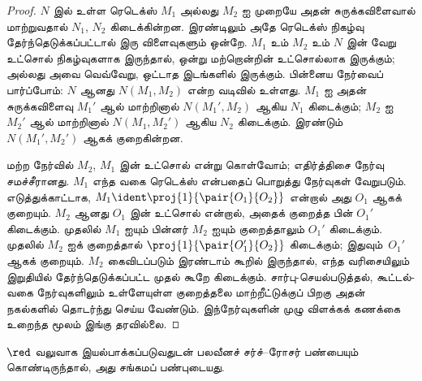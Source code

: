 \documentclass[../../../include/open-logic-section]{subfiles}
\begin{document}
\begin{proof}
  $N$ இல் உள்ள ரெடெக்ஸ் $M_1$ அல்லது $M_2$ ஐ
  முறையே அதன் சுருக்கவிளைவால் மாற்றுவதால் $N_1$,
  $N_2$ கிடைக்கின்றன. இரண்டிலும் அதே ரெடெக்ஸ்
  நிகழ்வு தேர்ந்தெடுக்கப்பட்டால் இரு விளைவுகளும் ஒன்றே.
  $M_1$ உம் $M_2$ உம் $N$ இன் வேறு உட்சொல்
  நிகழ்வுகளாக இருந்தால்,
  ஒன்று மற்றொன்றின் உட்சொல்லாக இருக்கும்; அல்லது
  அவை வெவ்வேறு, ஒட்டாத இடங்களில் இருக்கும்.
  பின்னைய நேர்வைப் பார்ப்போம்: $N$ ஆனது
  $N(M_1,M_2)$ என்ற வடிவில் உள்ளது. $M_1$ ஐ அதன்
  சுருக்கவிளைவு $M_1'$ ஆல் மாற்றினால்
  $N(M_1',M_2)$ ஆகிய $N_1$ கிடைக்கும்;
  $M_2$ ஐ $M_2'$ ஆல் மாற்றினால் $N(M_1,M_2')$
  ஆகிய $N_2$ கிடைக்கும். இரண்டும்
  $N(M_1',M_2')$ ஆகக் குறைகின்றன.

  மற்ற நேர்வில் $M_2$, $M_1$ இன் உட்சொல் என்று
  கொள்வோம்; எதிர்த்திசை நேர்வு சமச்சீரானது. $M_1$
  எந்த வகை ரெடெக்ஸ் என்பதைப் பொறுத்து நேர்வுகள்
  வேறுபடும். எடுத்துக்காட்டாக,
  $M_1 \ident \proj{1}{\pair{O_1}{O_2}}$
  என்றால் அது $O_1$ ஆகக் குறையும். $M_2$ ஆனது
  $O_1$ இன் உட்சொல் என்றால், அதைக் குறைத்த பின்
  $O_1'$ கிடைக்கும். முதலில் $M_1$ ஐயும் பின்னர்
  $M_2$ ஐயும் குறைத்தாலும் $O_1'$ கிடைக்கும்.
  முதலில் $M_2$ ஐக் குறைத்தால்
  $\proj{1}{\pair{O_1'}{O_2}}$ கிடைக்கும்;
  இதுவும்~$O_1'$ ஆகக் குறையும். $M_2$ கைவிடப்படும்
  இரண்டாம் கூறில் இருந்தால், எந்த வரிசையிலும்
  இறுதியில் தேர்ந்தெடுக்கப்பட்ட முதல் கூறே கிடைக்கும்.
  சார்பு-செயல்படுத்தல்,
  கூட்டல்-வகை நேர்வுகளிலும் உள்ளேயுள்ள குறைத்தலை
  மாற்றீட்டுக்குப் பிறகு அதன் நகல்களில் தொடர்ந்து
  செய்ய வேண்டும். இந்நேர்வுகளின் முழு விளக்கக்
  கணக்கை உறைந்த மூலம் இங்கு தரவில்லை.
\end{proof}

\begin{lem}[நியூமனின் துணைத்தேற்றம்]
$\red$ வலுவாக இயல்பாக்கப்படுவதுடன் பலவீனச்
சர்ச்--ரோசர் பண்பையும் கொண்டிருந்தால், அது சங்கமப்
பண்புடையது.
\end{lem}
\end{document}
